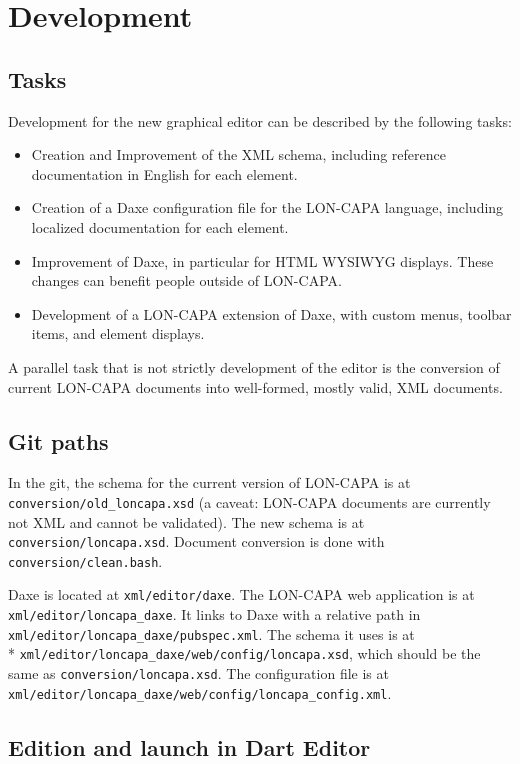 \section{Development}

\subsection{Tasks}

Development for the new graphical editor can be described by the following tasks:
\begin{itemize}
\item Creation and Improvement of the XML schema, including reference documentation in English for each element.
\item Creation of a Daxe configuration file for the LON-CAPA language, including localized documentation for each element.
\item Improvement of Daxe, in particular for HTML WYSIWYG displays. These changes can benefit people outside of LON-CAPA.
\item Development of a LON-CAPA extension of Daxe, with custom menus, toolbar items, and element displays.
\end{itemize}
A parallel task that is not strictly development of the editor is the conversion of current LON-CAPA documents into well-formed, mostly valid, XML documents.

\subsection{Git paths}

In the git, the schema for the current version of LON-CAPA is at \texttt{conversion/old\_loncapa.xsd} (a caveat: LON-CAPA documents are currently not XML and cannot be validated). The new schema is at \texttt{conversion/loncapa.xsd}. Document conversion is done with \texttt{conversion/clean.bash}.

Daxe is located at \texttt{xml/editor/daxe}. The LON-CAPA web application is at \texttt{xml/editor/loncapa\_daxe}. It links to Daxe with a relative path in \texttt{xml/editor/loncapa\_daxe/pubspec.xml}. The schema it uses is at \\* \texttt{xml/editor/loncapa\_daxe/web/config/loncapa.xsd}, which should be the same as \texttt{conversion/loncapa.xsd}. The configuration file is at \texttt{xml/editor/loncapa\_daxe/web/config/loncapa\_config.xml}.

\subsection{Edition and launch in Dart Editor}

